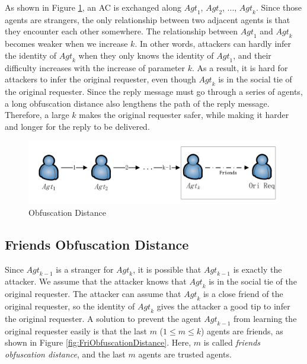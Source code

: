 As shown in Figure \ref{fig:ObfuscationDistance}, an AC is exchanged along ${Agt}_1$, ${Agt}_2$, ..., ${Agt}_k$. Since those agents are strangers, the only relationship between two adjacent agents is that they encounter each other somewhere. The relationship between ${Agt}_1$ and ${Agt}_k$ becomes weaker when we increase $k$. In other words, attackers can hardly infer the identity of ${Agt}_k$ when they only knows the identity of ${Agt}_1$, and their difficulty increases with the increase of parameter $k$. As a result, it is hard for attackers to infer the original requester, even though ${Agt}_k$ is in the social tie of the original requester. Since the reply message must go through a series of agents, a long obfuscation distance also lengthens the path of the reply message. Therefore, a large $k$ makes the original requester safer, while making it harder and longer for the reply to be delivered.

\begin{figure} [hbtp]
  \centering 
  \includegraphics[width=6.0in]{figures/ACPObfDis.png}
  \caption{Obfuscation Distance} 
  \label{fig:ObfuscationDistance} %
\end{figure}

\subsection{ Friends Obfuscation Distance}

\noindent Since ${Agt}_{k-1}$ is a stranger for ${Agt}_k$, it is possible that ${Agt}_{k-1}$ is exactly the attacker. We assume that the attacker knows that ${Agt}_k$ is in the social tie of the original requester. The attacker can assume that ${Agt}_k$ is a close friend of the original requester, so the identity of ${Agt}_k$ gives the attacker a good tip to infer the original requester. A solution to prevent the agent ${Agt}_{k-1}$ from learning the original requester easily is that the last $m$ ($1\leq m\leq k$) agents are friends, as shown in Figure \ref{fig:FriObfuscationDistance}. Here, $m$ is called \textit{friends obfuscation distance}, and the last $m$ agents are trusted agents.

